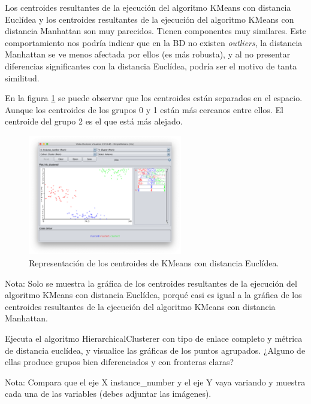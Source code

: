 \documentclass[11pt]{exam}
\begin{document}
\begin{questions}
\begin{parts}
Los centroides resultantes de la ejecución del algoritmo KMeans con distancia Euclídea y los centroides resultantes de la ejecución del algoritmo KMeans con distancia Manhattan son muy parecidos. Tienen componentes muy similares. Este comportamiento nos podría indicar que en la BD no existen \textit{outliers}, la distancia Manhattan se ve menos afectada por ellos (es más robusta), y al no presentar diferencias significantes con la distancia Euclídea, podría ser el motivo de tanta similitud.

En la figura \ref{Captura_5} se puede observar que los centroides están separados en el espacio. Aunque los centroides de los grupos 0 y 1 están más cercanos entre ellos. El centroide del grupo 2 es el que está más alejado.

\begin{figure}[h]
	\centering
	\includegraphics[width=0.6\textwidth]{kmeans_euclidea_centroides_graph.png}
	\caption{Representación de los centroides de KMeans con distancia Euclídea.}
	\label{Captura_5}
\end{figure}

\end{parts}

Nota: Solo se muestra la gráfica de los centroides resultantes de la ejecución del algoritmo KMeans con distancia Euclídea, porqué casi es igual a la gráfica de los centroides resultantes de la ejecución del algoritmo KMeans con distancia Manhattan.

{\question Ejecuta el algoritmo HierarchicalClusterer con tipo de enlace completo y métrica de distancia euclídea, y visualice las gráficas de los puntos agrupados. ¿Alguno de ellas produce grupos bien diferenciados y con fronteras claras?}

Nota: Compara que el eje X instance\_number y el eje Y vaya variando y muestra cada una de las variables (debes adjuntar las imágenes).


\end{questions}
\end{document}
